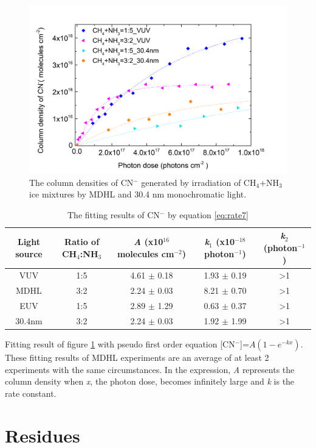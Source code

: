\begin{figure}
\centering
\includegraphics[width=\textwidth]{figures/chapter3/CN_rate_EUV.png}
\caption{The column densities of CN$^-$ generated by irradiation of CH$_4$+NH$_3$ ice mixtures by MDHL and 30.4 nm monochromatic light.}
\label{fig:CN_NSRRC}
\end{figure}

\begin{table}[htbp]
\caption{The fitting results of CN$^-$ by equation \ref{eq:rate7}}
\label{tab:CNrate_NSRRC}
\begin{tabular}{ccccc}
\hline
\hline
Light source & Ratio of CH$_4$:NH$_3$ & \textit{A} (x10$^{16}$ molecules cm$^{-2}$) & \textit{k$_1$} (x10$^{-18}$ photon$^{-1}$) & \textit{k$_2$} (photon$^{-1}$)\\
\hline
VUV & 1:5 & 4.61 $\pm$ 0.18 & 1.93 $\pm$ 0.19 & >1 \\
MDHL & 3:2 & 2.24 $\pm$ 0.03 & 8.21 $\pm$ 0.70 & >1 \\
\hline
EUV & 1:5 & 2.89 $\pm$ 1.29 & 0.63 $\pm$ 0.37 & >1 \\
 30.4nm & 3:2 & 2.24 $\pm$ 0.03 & 1.92 $\pm$ 1.99 & >1 \\
\hline
\end{tabular}
Fitting result of figure \ref{fig:CN_NSRRC} with pseudo first order equation [CN$^-$]=$A(1-e^{-kx})$. These fitting results of MDHL experiments are an average of at least 2 experiments with the same circumstances. In the expression, \textit{A} represents the column density when \textit{x}, the photon dose, becomes infinitely large and \textit{k} is the rate constant.\
\end{table}


\section{Residues}


